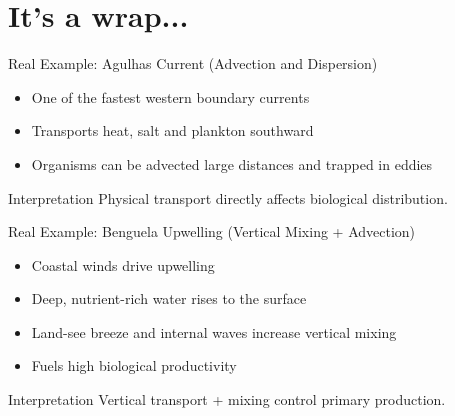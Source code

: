 \documentclass[english,aspectratio=169]{beamer}
\begin{document}
\section{It's a wrap...}
\begin{frame}{Real Example: Agulhas Current (Advection and Dispersion)}
\begin{itemize}
\item One of the fastest western boundary currents
\item Transports heat, salt and plankton southward
\item Organisms can be advected large distances and trapped in eddies
\end{itemize}

\begin{block}{Interpretation}
Physical transport directly affects biological distribution.
\end{block}
\end{frame}

\begin{frame}{Real Example: Benguela Upwelling (Vertical Mixing + Advection)}
\begin{itemize}
\item Coastal winds drive upwelling
\item Deep, nutrient-rich water rises to the surface
\item Land-see breeze and internal waves increase vertical mixing
\item Fuels high biological productivity
\end{itemize}

\begin{block}{Interpretation}
Vertical transport + mixing control primary production.
\end{block}
\end{frame}
\end{document}
